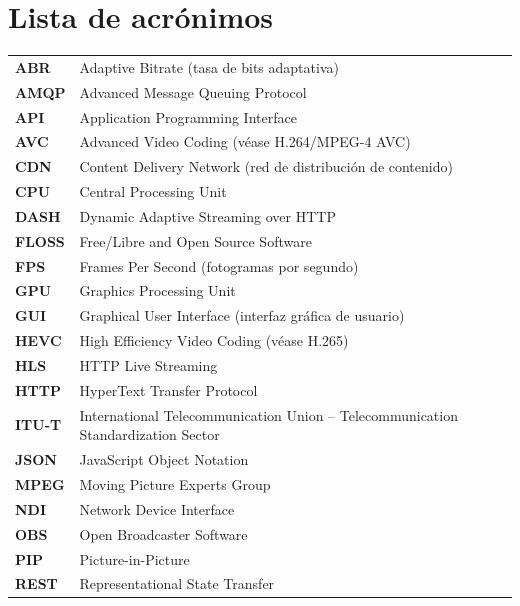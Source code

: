 \newpage
\thispagestyle{fancy}

\chapter*{Lista de acrónimos}

\begin{tabular}{lp{12cm}}
  \textbf{ABR}   & Adaptive Bitrate (tasa de bits adaptativa) \\
  \textbf{AMQP}  & Advanced Message Queuing Protocol \\
  \textbf{API}   & Application Programming Interface \\
  \textbf{AVC}   & Advanced Video Coding (véase H.264/MPEG-4 AVC) \\
  \textbf{CDN}   & Content Delivery Network (red de distribución de contenido) \\
  \textbf{CPU}   & Central Processing Unit \\
  \textbf{DASH}  & Dynamic Adaptive Streaming over HTTP \\
  \textbf{FLOSS} & Free/Libre and Open Source Software \\
  \textbf{FPS}   & Frames Per Second (fotogramas por segundo) \\
  \textbf{GPU}   & Graphics Processing Unit \\
  \textbf{GUI}   & Graphical User Interface (interfaz gráfica de usuario) \\
  \textbf{HEVC}  & High Efficiency Video Coding (véase H.265) \\
  \textbf{HLS}   & HTTP Live Streaming \\
  \textbf{HTTP}  & HyperText Transfer Protocol \\
  \textbf{ITU-T} & International Telecommunication Union – Telecommunication Standardization Sector \\
  \textbf{JSON}  & JavaScript Object Notation \\
  \textbf{MPEG}  & Moving Picture Experts Group \\
  \textbf{NDI}   & Network Device Interface \\
  \textbf{OBS}   & Open Broadcaster Software \\
  \textbf{PIP}   & Picture-in-Picture \\
  \textbf{REST}  & Representational State Transfer \\

\end{tabular}
